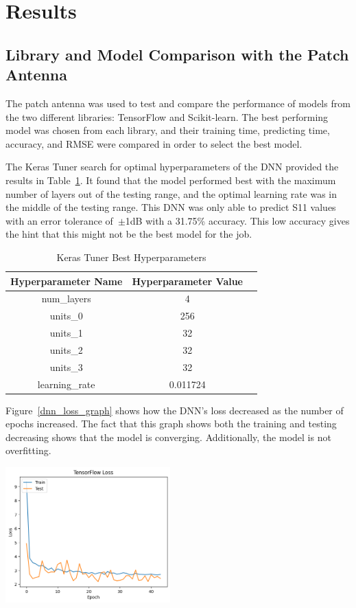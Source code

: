 \documentclass[lettersize,journal]{IEEEtran}
\newenvironment{Figure}
    {\par\medskip\noindent\minipage{\linewidth}}
    {\endminipage\par\medskip}
\begin{document}
\section{Results}
\subsection{Library and Model Comparison with the Patch Antenna}
The patch antenna was used to test and compare the performance of models from the two different libraries: TensorFlow and Scikit-learn. The best performing model was chosen from each library, and their training time, predicting time, accuracy, and RMSE were compared in order to select the best model.

The Keras Tuner search for optimal hyperparameters of the DNN provided the results in Table~\ref{keras_best_params}. It found that the model performed best with the maximum number of layers out of the testing range, and the optimal learning rate was in the middle of the testing range. This DNN was only able to predict S11 values with an error tolerance of~$\pm$1dB with a 31.75\% accuracy. This low accuracy gives the hint that this might not be the best model for the job.

\begin{table}[h]
\caption{Keras Tuner Best Hyperparameters}
\begin{center}
\begin{tabular}{ |c|c|c| }
    \hline
    Hyperparameter Name & Hyperparameter Value \\ 
    \hline
    num\_layers & 4 \\  
    \hline
    units\_0 & 256 \\
    \hline
    units\_1 & 32 \\
    \hline
    units\_2 & 32 \\
    \hline
    units\_3 & 32 \\
    \hline
    learning\_rate & 0.011724 \\
    \hline
\end{tabular}
\end{center}
\label{keras_best_params}
\end{table}

Figure~\ref{dnn_loss_graph} shows how the DNN's loss decreased as the number of epochs increased. The fact that this graph shows both the training and testing decreasing shows that the model is converging. Additionally, the model is not overfitting. 

\begin{Figure}
    \centering
    \includegraphics[width=2.5in]{loss}
    \label{dnn_loss_graph}
\end{Figure}
\end{document}
